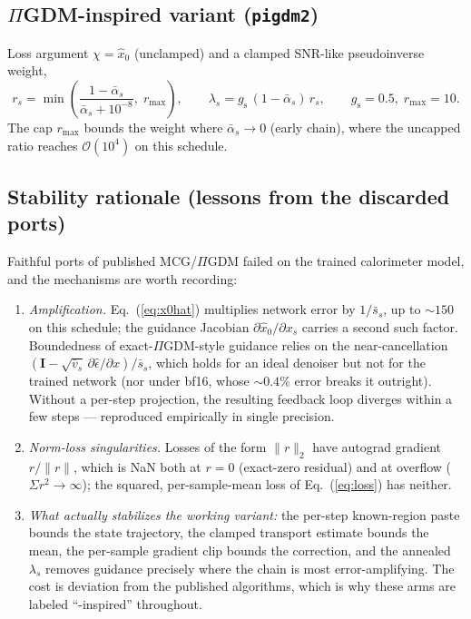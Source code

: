 \documentclass[11pt]{article}
\begin{document}
\subsection{$\Pi$GDM-inspired variant (\texttt{pigdm2})}
Loss argument $\chi = \hat x_0$ (unclamped) and a clamped SNR-like
pseudoinverse weight,
\begin{equation}
  r_s = \min\!\left(\frac{1-\bar\alpha_s}{\bar\alpha_s + 10^{-8}},\;
        r_{\max}\right), \qquad
  \lambda_s = g_{\mathrm{s}}\,(1-\bar\alpha_s)\, r_s ,
  \qquad g_{\mathrm{s}} = 0.5,\; r_{\max} = 10 .
\end{equation}
The cap $r_{\max}$ bounds the weight where
$\bar\alpha_s \to 0$ (early chain), where the uncapped ratio reaches
$\mathcal{O}(10^4)$ on this schedule.

\subsection{Stability rationale (lessons from the discarded ports)}
\label{sec:guided:stability}

Faithful ports of published MCG/$\Pi$GDM failed on the trained
calorimeter model, and the mechanisms are worth recording:
\begin{enumerate}
  \item \emph{Amplification.}  Eq.~(\ref{eq:x0hat}) multiplies network
        error by $1/\bar s_s$, up to $\sim 150$ on this schedule; the
        guidance Jacobian $\partial \hat x_0/\partial x_s$ carries a
        second such factor.  Boundedness of exact-$\Pi$GDM-style
        guidance relies on the near-cancellation
        $(\mathbf{I} - \sqrt{\bar v_s}\,\partial\hat\epsilon/\partial
        x)/\bar s_s$, which holds for an ideal denoiser but not for the
        trained network (nor under bf16, whose $\sim 0.4\%$ error breaks
        it outright).  Without a per-step projection, the resulting
        feedback loop diverges within a few steps --- reproduced
        empirically in single precision.
  \item \emph{Norm-loss singularities.}  Losses of the form
        $\lVert r \rVert_2$ have autograd gradient $r/\lVert r\rVert$,
        which is NaN both at $r = 0$ (exact-zero residual) and at
        overflow ($\Sigma r^2 \to \infty$); the squared, per-sample-mean
        loss of Eq.~(\ref{eq:loss}) has neither.
  \item \emph{What actually stabilizes the working variant:} the
        per-step known-region paste bounds the state trajectory, the
        clamped transport estimate bounds the mean, the per-sample
        gradient clip bounds the correction, and the annealed
        $\lambda_s$ removes guidance precisely where the chain is most
        error-amplifying.  The cost is deviation from the published
        algorithms, which is why these arms are labeled
        ``-inspired'' throughout.
\end{enumerate}
\end{document}
